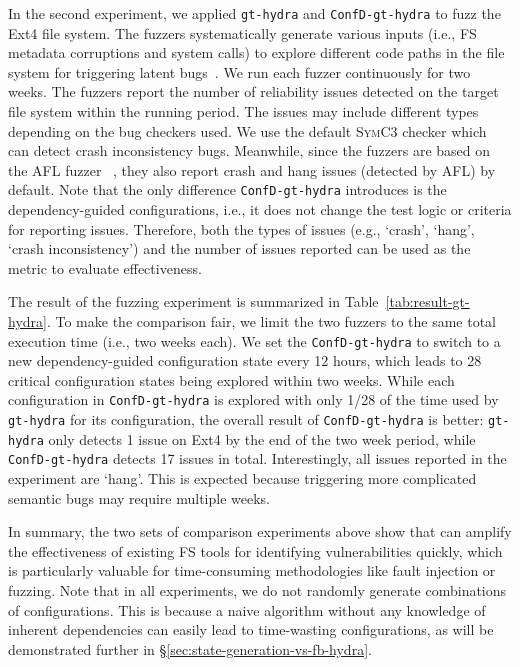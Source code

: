 In the  second experiment, we applied \texttt{gt-hydra}  and \texttt{ConfD-gt-hydra} to fuzz the Ext4 file system.  
The fuzzers systematically generate various inputs (i.e., FS metadata corruptions and system calls) to explore different code paths in the file system for triggering latent bugs~\cite{hydra-2019}.
We run each  fuzzer continuously for two weeks.  The fuzzers report the number of reliability issues  detected on the target file system within the running period. The issues may include different types depending on the bug checkers used. We use the default \textsc{SymC3} checker which can detect crash inconsistency bugs. Meanwhile, since  the fuzzers are based on the AFL fuzzer ~\cite{afl}, they also report crash and hang issues (detected by AFL) by default. 
Note that the only difference \texttt{ConfD-gt-hydra} introduces is the dependency-guided configurations,
i.e., it does not change the test logic or criteria for reporting issues. Therefore, both the types of issues (e.g., `crash', `hang', `crash inconsistency') and the number of issues reported can be 
used as the metric to evaluate effectiveness.

The result of the fuzzing experiment is summarized in Table~\ref{tab:result-gt-hydra}.
To make the comparison fair, we limit the two fuzzers to the same total execution time (i.e., two weeks each).
We set the \texttt{ConfD-gt-hydra} to switch to a new dependency-guided configuration state every 12 hours, which leads to 28 critical configuration states being explored within two weeks. While each configuration in \texttt{ConfD-gt-hydra} is  explored with only 1/28 of the  time used by \texttt{gt-hydra} for its configuration, the overall result of \texttt{ConfD-gt-hydra} is   better:  \texttt{gt-hydra} only detects 1 issue on Ext4 by the end of the two week period, while \texttt{ConfD-gt-hydra} detects 17 issues in total. 
Interestingly, all issues   reported in the experiment are `hang'. 
This is expected because triggering  more complicated semantic bugs may require multiple weeks. 
 
In summary, the two sets of comparison experiments  above show that  \prj can  amplify the effectiveness of existing FS tools for identifying vulnerabilities quickly, which is particularly valuable for time-consuming methodologies like fault injection or fuzzing. 
Note that in all experiments, we do not randomly generate combinations of configurations. This is because a naive algorithm without any knowledge of inherent dependencies can easily lead to time-wasting configurations, as   will be  demonstrated further  in \S\ref{sec:state-generation-vs-fb-hydra}.